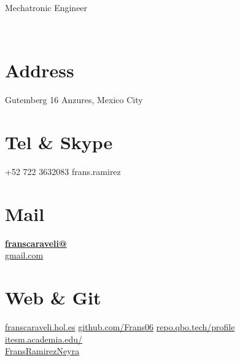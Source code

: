 \documentclass[]{friggeri-cv}
\begin{document}
      {Mechatronic Engineer}
      

\begin{aside}
	~
	~
	~
	~
	~
	~
	~
	~
	~	
  \section{Address}
    Gutemberg 16
    Anzures, Mexico City
    ~
  \section{Tel \& Skype}
    +52 722 3632083
    frans.ramirez
    ~
  \section{Mail}
    \href{mailto:franscaraveli@gmail.com}{\textbf{franscaraveli@}\\gmail.com}
    ~
  \section{Web \& Git}
    \href{http://fransramirez.hol.es}{franscaraveli.hol.es}
    \href{https://github.com/Frans06}{github.com/Frans06}
    \href{https://repo.qbo.tech:5443/profile}{repo.qbo.tech/profile}
    \href{https://itesm.academia.edu/FransRamirezNeyra}{itesm.academia.edu/\\FransRamirezNeyra}
    ~
    ~
\end{aside}
~
\end{document}
